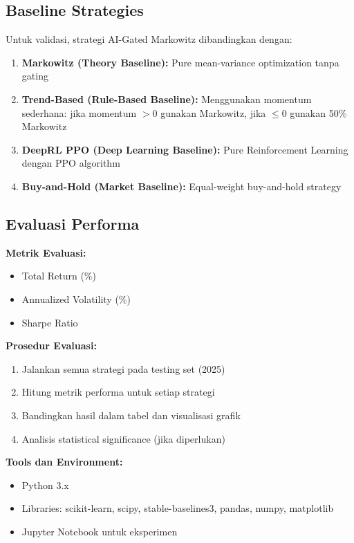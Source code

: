 \documentclass[12pt,a4paper]{article}
\begin{document}
\subsection{Baseline Strategies}

Untuk validasi, strategi AI-Gated Markowitz dibandingkan dengan:

\begin{enumerate}
    \item \textbf{Markowitz (Theory Baseline):} Pure mean-variance optimization tanpa gating
    
    \item \textbf{Trend-Based (Rule-Based Baseline):} Menggunakan momentum sederhana: jika momentum $> 0$ gunakan Markowitz, jika $\leq 0$ gunakan 50\% Markowitz
    
    \item \textbf{DeepRL PPO (Deep Learning Baseline):} Pure Reinforcement Learning dengan PPO algorithm
    
    \item \textbf{Buy-and-Hold (Market Baseline):} Equal-weight buy-and-hold strategy
\end{enumerate}

\subsection{Evaluasi Performa}

\textbf{Metrik Evaluasi:}
\begin{itemize}
    \item Total Return (\%)
    \item Annualized Volatility (\%)
    \item Sharpe Ratio
\end{itemize}

\textbf{Prosedur Evaluasi:}
\begin{enumerate}
    \item Jalankan semua strategi pada testing set (2025)
    \item Hitung metrik performa untuk setiap strategi
    \item Bandingkan hasil dalam tabel dan visualisasi grafik
    \item Analisis statistical significance (jika diperlukan)
\end{enumerate}

\textbf{Tools dan Environment:}
\begin{itemize}
    \item Python 3.x
    \item Libraries: scikit-learn, scipy, stable-baselines3, pandas, numpy, matplotlib
    \item Jupyter Notebook untuk eksperimen
\end{itemize}
\end{document}
